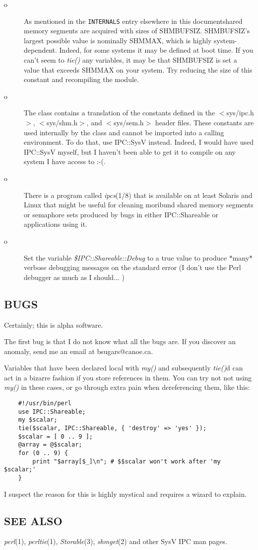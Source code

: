 \begin{description}

\item[o]
As mentioned in the {\tt INTERNALS} entry elsewhere in this documentshared memory segments are acquired
with sizes of SHM\underscore{}BUFSIZ.  SHM\underscore{}BUFSIZ's largest possible value is
nominally SHMMAX, which is highly system-dependent.  Indeed, for some
systems it may be defined at boot time.  If you can't seem to {\em tie()\/}
any variables, it may be that SHM\underscore{}BUFSIZ is set a value that exceeds
SHMMAX on your system.  Try reducing the size of this constant and
recompiling the module.

\item[o]
The class contains a translation of the constants defined in the
$<$sys/ipc.h$>$, $<$sys/shm.h$>$, and $<$sys/sem.h$>$ header files.  These
constants are used internally by the class and cannot be imported into
a calling environment.  To do that, use IPC::SysV instead.  Indeed, I
would have used IPC::SysV myself, but I haven't been able to get it to
compile on any system I have access to :-(.

\item[o]
There is a program called {\em ipcs\/}(1/8) that is available on at least
Solaris and Linux that might be useful for cleaning moribund shared
memory segments or semaphore sets produced by bugs in either
IPC::Shareable or applications using it.

\item[o]
Set the variable {\em \$IPC::Shareable::Debug\/} to a true value to produce
$\ast$many$\ast$ verbose debugging messages on the standard error (I don't use
the Perl debugger as much as I should... )

\end{description}

\subsection*{BUGS}
Certainly; this is alpha software.

The first bug is that I do not know what all the bugs are. If you
discover an anomaly, send me an email at bsugars@canoe.ca.

Variables that have been declared local with {\em my()\/} and subsequently
{\em tie()\/}d can act in a bizarre fashion if you store references in them.
You can try not not using {\em my()\/} in these cases, or go through extra
pain when dereferencing them, like this:
\begin{verbatim}
    #!/usr/bin/perl
    use IPC::Shareable;
    my $scalar;
    tie($scalar, IPC::Shareable, { 'destroy' => 'yes' });
    $scalar = [ 0 .. 9 ];
    @array = @$scalar;
    for (0 .. 9) {
        print "$array[$_]\n"; # $$scalar won't work after 'my $scalar;'
    }
\end{verbatim}

I suspect the reason for this is highly mystical and requires a wizard
to explain.

\subsection*{SEE ALSO}
{\em perl\/}(1), {\em perltie\/}(1), {\em Storable\/}(3), {\em shmget\/}(2) and other SysV IPC man
pages.

